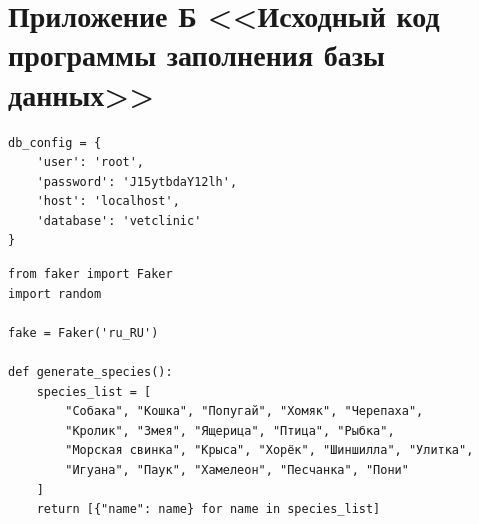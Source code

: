 \documentclass[a4paper]{article}
\begin{document}
\newpage
\section*{Приложение Б <<Исходный код программы заполнения базы данных>>}
\label{section:Б}
\begin{lstlisting}[caption = Подключение к базе данных, basicstyle= \scriptsize \ttfamily]
db_config = {
    'user': 'root',
    'password': 'J15ytbdaY12lh',
    'host': 'localhost',
    'database': 'vetclinic'
}
\end{lstlisting}

\begin{lstlisting}[caption = Генерация значений для таблиц, basicstyle= \scriptsize \ttfamily]
from faker import Faker
import random

fake = Faker('ru_RU')

def generate_species():
    species_list = [
        "Собака", "Кошка", "Попугай", "Хомяк", "Черепаха",
        "Кролик", "Змея", "Ящерица", "Птица", "Рыбка",
        "Морская свинка", "Крыса", "Хорёк", "Шиншилла", "Улитка",
        "Игуана", "Паук", "Хамелеон", "Песчанка", "Пони"
    ]
    return [{"name": name} for name in species_list]


\end{lstlisting}
\end{document}
